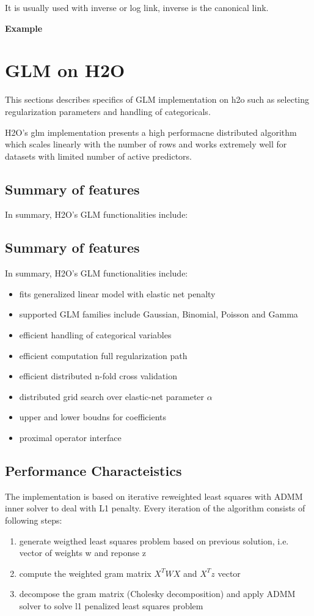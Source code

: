 \documentclass[11pt]{article}
\begin{document}
It is usually used with inverse or log link, inverse is the canonical link.



\textbf{Example}


\section{GLM on H2O}
This sections describes specifics of GLM implementation on h2o such as selecting regularization parameters and handling of categoricals. 

H2O's glm implementation presents a high performacne distributed algorithm which scales linearly with the number of rows and works extremely well for datasets with limited number of active predictors. 

\subsection{Summary of features} 
In summary, H2O's GLM functionalities include:

\subsection{Summary of features} 
In summary, H2O's GLM functionalities include:


\begin{itemize} 
\item fits generalized linear model with elastic net penalty
\item supported GLM families include Gaussian, Binomial, Poisson and Gamma
\item efficient handling of categorical variables
\item efficient computation full regularization path
\item efficient distributed n-fold cross validation
\item distributed grid search over elastic-net parameter $\alpha$
\item upper and lower boudns for coefficients
\item proximal operator interface
\end{itemize}

\subsection{Performance Characteistics}
The implementation is based on iterative reweighted least squares with ADMM inner solver to deal with L1 penalty. Every iteration of the algorithm consists of following steps:
\begin{enumerate} 
\item generate weigthed least squares problem based on previous solution, i.e. vector of weights w and reponse z 
\item compute the weighted gram matrix $X^TWX$ and $X^Tz$ vector
\item decompose the gram matrix (Cholesky decomposition) and apply ADMM solver to solve l1 penalized least squares problem
\end{enumerate}
\end{document}
